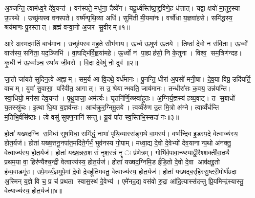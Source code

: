 \clearpage
{}
\setcounter{anuvakam}{0}
अ॒ञ्जन्ति॒ त्वाम॑ध्व॒रे दे॑व॒यन्त॑। वन॑स्पते॒ मधु॑ना॒ दैव्ये॑न। यदू॒र्ध्वस्ति॑ष्ठा॒द्द्रवि॑णे॒ह ध॑त्तात्। यद्वा॒ क्षयो॑ मा॒तुर॒स्या उ॒पस्थे। उच्छ्र॑यस्व वनस्पते। वर्ष्म॑न्पृथि॒व्या अधि॑। सुमि॑ती मी॒यमा॑नः। वर्चो॑धा य॒ज्ञवा॑हसे। समि॑द्धस्य॒ श्रय॑माणः पु॒रस्तात्। ब्रह्म॑ वन्वा॒नो अ॒जर सु॒वीरम्॥१॥

आ॒रे अ॒स्मदम॑तिं॒ बाध॑मानः। उच्छ्र॑यस्व मह॒ते सौभ॑गाय। ऊ॒र्ध्व ऊ॒षुण॑ ऊ॒तये। तिष्ठा॑ दे॒वो न स॑वि॒ता। ऊ॒र्ध्वो वाज॑स्य॒ सनि॑ता॒ यद॒ञ्जिभि॑। वा॒घद्भि॑र्वि॒ह्वया॑महे। ऊ॒र्ध्वो न॑ पा॒ह्यह॑सो॒ नि के॒तुना। विश्व॒ सम॒त्रिण॑न्दह। कृ॒धी न॑ ऊ॒र्ध्वाञ्च॒ रथा॑य जी॒वसे। वि॒दा दे॒वेषु॑ नो॒ दुव॑॥२॥

जा॒तो जा॑यते सुदिन॒त्वे अह्नाम्। सम॒र्य आ वि॒दथे॒ वर्ध॑मानः। पु॒नन्ति॒ धीरा॑ अ॒पसो॑ मनी॒षा। दे॒व॒या विप्र॒ उदि॑यर्ति॒ वाचम्। युवा॑ सु॒वासा॒ परि॑वीत॒ आगात्। स उ॒ श्रेयान्भवति॒ जाय॑मानः। तन्धीरा॑सः क॒वय॒ उन्न॑यन्ति। स्वा॒धियो॒ मन॑सा देव॒यन्त॑। पृ॒थु॒पाजा॒ अम॑र्त्यः। घृ॒तनि॑र्णि॒ख्स्वा॑हुतः। अ॒ग्निर्य॒ज्ञस्य॑ हव्य॒वाट्। त स॒बाधो॑ य॒तस्स्रु॑चः। इ॒त्था धि॒या य॒ज्ञव॑न्तः। आच॑क्रुर॒ग्निमू॒तये। त्वव्वँरु॑ण उ॒त मि॒त्रो अ॑ग्ने। त्वाव्वँ॑र्धन्ति म॒तिभि॒र्वसि॑ष्ठाः। त्वे वसु॑ सुषण॒नानि॑ सन्तु। यू॒यं पा॑त स्व॒स्तिभि॒स्सदा॑ नः॥३॥\anuvakamend[सु॒वीर॒न्दुव॒ स्वा॑हुतो॒ऽष्टौ च॑]

होता॑ यख्षद॒ग्नि स॒मिधा॑ सुष॒मिधा॒ समि॑द्धं॒ नाभा॑ पृथि॒व्यास्स॑ङ्ग॒थे वा॒मस्य॑। वर्ष्म॑न्दि॒व इ॒डस्प॒दे वेत्वाज्य॑स्य॒ होत॒र्यज॑। होता॑ यख्ष॒त्तनू॒नपा॑त॒मदि॑ते॒र्गर्भं॒ भुव॑नस्य गो॒पाम्। मध्वा॒द्य दे॒वो दे॒वेभ्यो॑ देव॒यानान्प॒थो अ॑नक्तु॒ वेत्वाज्य॑स्य॒ होत॒र्यज॑। होता॑ यख्ष॒न्नरा॒शसं॑ नृश॒स्त्रं नॄः प्र॑णेत्रम्। गोभि॑र्व॒पावा॒न्थ्स्याद्वी॒रैश्शक्ती॑वा॒न्रथै प्रथम॒या वा॒ हिर॑ण्यैश्च॒न्द्री वेत्वाज्य॑स्य॒ होत॒र्यज॑। होता॑ यख्षद॒ग्निमि॒ड ई॑डि॒तो दे॒वो दे॒वा आव॑क्षद्दू॒तो ह॑व्य॒वाडमू॑रः। उपे॒मय्यँ॒ज्ञमुपे॒मां दे॒वो दे॒वहू॑तिमवतु॒ वेत्वाज्य॑स्य॒ होत॒र्यज॑। होता॑ यख्षद्ब॒र्‌हिस्सु॒ष्टरी॒मोर्णं॑म्रदा अ॒स्मिन् य॒ज्ञे वि च॒ प्र च॑ प्रथता स्वास॒स्थं दे॒वेभ्य॑। एमे॑नद॒द्य वस॑वो रु॒द्रा आ॑दि॒त्यास्स॑दन्तु प्रि॒यमिन्द्र॑स्यास्तु॒ वेत्याज्य॑स्य॒ होत॒र्यज॑॥४॥

